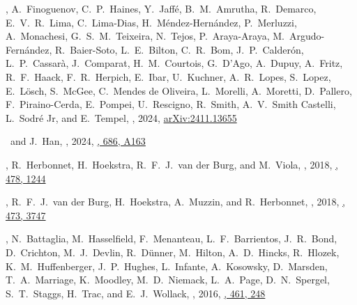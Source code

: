 
\item
\myself, A.~Finoguenov, C.~P.~Haines, Y.~Jaffé, B.~M.~Amrutha, R.~Demarco, E.~V.~R.~Lima, C.~Lima-Dias, H.~Méndez-Hernández, P.~Merluzzi, A.~Monachesi, G.~S.~M.~Teixeira, N.~Tejos, P.~Araya-Araya, M.~Argudo-Fernández, R.~Baier-Soto, L.~E.~Bilton, C.~R.~Bom, J.~P.~Calderón, L.~P.~Cassarà, J.~Comparat, H.~M.~Courtois, G.~D'Ago, A.~Dupuy, A.~Fritz, R.~F.~Haack, F.~R.~Herpich, E.~Ibar, U.~Kuchner, A.~R.~Lopes, S.~Lopez, E.~Lösch, S.~McGee, C.~Mendes de Oliveira, L.~Morelli, A.~Moretti, D.~Pallero, F.~Piraino-Cerda, E.~Pompei, U.~Rescigno, R.~Smith, A.~V.~Smith Castelli, L.~Sodré Jr, and E.~Tempel,
,
2024, \href{https://ui.adsabs.harvard.edu/abs/2024arXiv241113655S}{arXiv:2411.13655}
\submitted{\aap}

\item
\myself\ and J.~Han,
,
2024, \href{https://ui.adsabs.harvard.edu/abs/2024A&A...686A.163S}{\aap, 686, A163}

\item
\myself, R.~Herbonnet, H.~Hoekstra, R.~F.~J.~van der Burg, and M.~Viola,
,
2018, \href{https://ui.adsabs.harvard.edu/abs/2018MNRAS.478.1244S}{\mnras, 478, 1244}

\item
\myself, R.~F.~J.~van der Burg, H.~Hoekstra, A.~Muzzin, and R.~Herbonnet,
,
2018, \href{https://ui.adsabs.harvard.edu/abs/2018MNRAS.473.3747S}{\mnras, 473, 3747}

\item
\myself, N.~Battaglia, M.~Hasselfield, F.~Menanteau, L.~F.~Barrientos, J.~R.~Bond, D.~Crichton, M.~J.~Devlin, R.~Dünner, M.~Hilton, A.~D.~Hincks, R.~Hlozek, K.~M.~Huffenberger, J.~P.~Hughes, L.~Infante, A.~Kosowsky, D.~Marsden, T.~A.~Marriage, K.~Moodley, M.~D.~Niemack, L.~A.~Page, D.~N.~Spergel, S.~T.~Staggs, H.~Trac, and E.~J.~Wollack,
,
2016, \href{https://ui.adsabs.harvard.edu/abs/2016MNRAS.461..248S}{\mnras, 461, 248}

